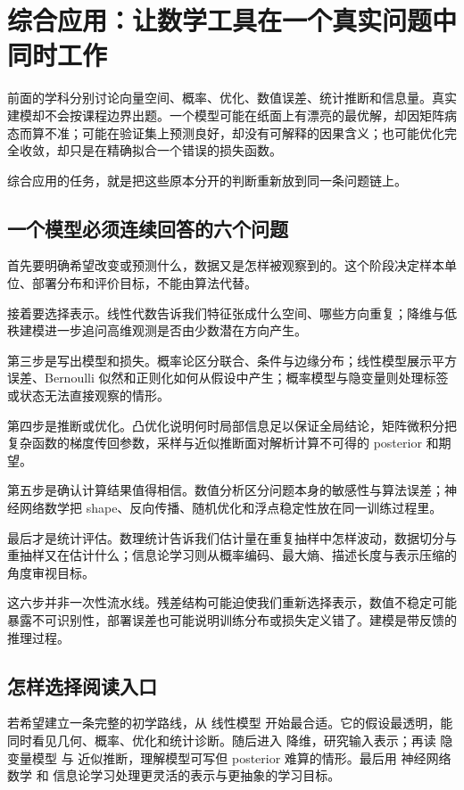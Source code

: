 \section{综合应用：让数学工具在一个真实问题中同时工作}

前面的学科分别讨论向量空间、概率、优化、数值误差、统计推断和信息量。真实建模却不会按课程边界出题。一个模型可能在纸面上有漂亮的最优解，却因矩阵病态而算不准；可能在验证集上预测良好，却没有可解释的因果含义；也可能优化完全收敛，却只是在精确拟合一个错误的损失函数。

综合应用的任务，就是把这些原本分开的判断重新放到同一条问题链上。

\subsection{一个模型必须连续回答的六个问题}

首先要明确希望改变或预测什么，数据又是怎样被观察到的。这个阶段决定样本单位、部署分布和评价目标，不能由算法代替。

接着要选择表示。线性代数告诉我们特征张成什么空间、哪些方向重复；降维与低秩建模进一步追问高维观测是否由少数潜在方向产生。

第三步是写出模型和损失。概率论区分联合、条件与边缘分布；线性模型展示平方误差、Bernoulli 似然和正则化如何从假设中产生；概率模型与隐变量则处理标签或状态无法直接观察的情形。

第四步是推断或优化。凸优化说明何时局部信息足以保证全局结论，矩阵微积分把复杂函数的梯度传回参数，采样与近似推断面对解析计算不可得的 posterior 和期望。

第五步是确认计算结果值得相信。数值分析区分问题本身的敏感性与算法误差；神经网络数学把 shape、反向传播、随机优化和浮点稳定性放在同一训练过程里。

最后才是统计评估。数理统计告诉我们估计量在重复抽样中怎样波动，数据切分与重抽样又在估计什么；信息论学习则从概率编码、最大熵、描述长度与表示压缩的角度审视目标。

这六步并非一次性流水线。残差结构可能迫使我们重新选择表示，数值不稳定可能暴露不可识别性，部署误差也可能说明训练分布或损失定义错了。建模是带反馈的推理过程。

\subsection{怎样选择阅读入口}

若希望建立一条完整的初学路线，从 线性模型 开始最合适。它的假设最透明，能同时看见几何、概率、优化和统计诊断。随后进入 降维，研究输入表示；再读 隐变量模型 与 近似推断，理解模型可写但 posterior 难算的情形。最后用 神经网络数学 和 信息论学习处理更灵活的表示与更抽象的学习目标。

